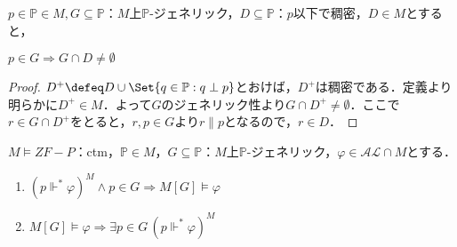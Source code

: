\documentclass[a4j]{ltjsarticle}
\theoremstyle{definition}
\begin{document}
\begin{lemma}\label{lem:below-dense-generic}
 $p \in \mathbb{P} \in M, G \subseteq \mathbb{P}$：$M$上$\mathbb{P}$-ジェネリック，$D \subseteq \mathbb{P}$：$p$以下で稠密，$D \in M$とすると，
 
 $p \in G \Rightarrow G \cap D \neq \emptyset$
\end{lemma}
\begin{proof}
 $D^+ \defeq D \cup \Set{ q \in \mathbb{P} : q \perp p}$とおけば，$D^+$は稠密である．定義より明らかに$D^+ \in M$．よって$G$のジェネリック性より$G \cap D^+ \neq \emptyset$．ここで$r \in G \cap D^+$をとると，$r, p \in G$より$r \mathrel{\|} p$となるので，$r \in D$．\mbox{}
\end{proof}

\begin{lemma}\label{lem:atomic-forces-and-genexts}
 $M \models ZF-P$：ctm，$\mathbb{P} \in M$，$G \subseteq \mathbb{P}$：$M$上$\mathbb{P}$-ジェネリック，$\varphi \in \mathcal{AL} \cap M$とする．
 \begin{enumerate}[label=(\alph*)]
  \item $(p \mathrel{\Vdash^*} \varphi)^M \wedge p \in G\Rightarrow M[G] \models \varphi$
  \item $M[G] \models \varphi \Rightarrow \exists p \in G\, (p \mathrel{\Vdash^*} \varphi)^M$
 \end{enumerate}
\end{lemma}
\end{document}
